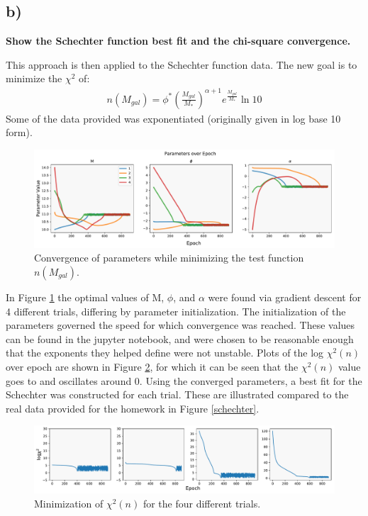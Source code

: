 \documentclass{article}
\begin{document}
\subsection*{b)}
{\bf Show the Schechter function best fit and the chi-square convergence.}\\
\par This approach is then applied to the Schechter function data. The new goal is to minimize the $\chi^2$ of: \begin{align}
    n(M_{gal}) = \phi^* (\frac{M_{gal}}{M_{*}})^{\alpha + 1} e^{\frac{M_{gal}}{M_{*}}} \ln{10}
\end{align}
Some of the data provided was exponentiated (originally given in log base 10 form). 
\begin{figure}[h]
  \centering
    \includegraphics[width=1.0\textwidth]{param_convergenceMgal_2.pdf}
      \caption{Convergence of parameters while minimizing the test function $n(M_{gal})$.}
    \label{param_Mgal}
\end{figure}
In Figure \ref{param_Mgal} the optimal values of M, $\phi$, and $\alpha$ were found via gradient descent for 4 different trials, differing by parameter initialization. The initialization of the parameters governed the speed for which convergence was reached. These values can be found in the jupyter notebook, and were chosen to be reasonable enough that the exponents they helped define were not unstable. Plots of the log $\chi^2(n)$ over epoch are shown in Figure \ref{chi2}, for which it can be seen that the $\chi^2(n)$ value goes to and oscillates around 0. Using the converged parameters, a best fit for the Schechter was constructed for each trial. These are illustrated compared to the real data provided for the homework in Figure \ref{schechter}.

\begin{figure}[h]
  \centering
    \includegraphics[width=1.0\textwidth]{chi2_2.pdf}
      \caption{Minimization of $\chi^2(n)$ for the four different trials.}
    \label{chi2}
\end{figure}
\end{document}
